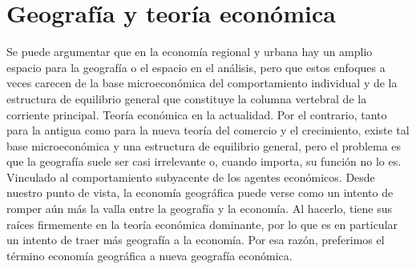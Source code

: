 \section{Geografía y teoría económica}
Se puede argumentar que en la economía regional y urbana hay un amplio espacio para la geografía o el espacio en el análisis, pero que estos enfoques a veces carecen de la base microeconómica del comportamiento individual y de la estructura de equilibrio general que constituye la columna vertebral de la corriente principal. Teoría económica en la actualidad. Por el contrario, tanto para la antigua como para la nueva teoría del comercio y el crecimiento, existe tal base microeconómica y una estructura de equilibrio general, pero el problema es que la geografía suele ser casi irrelevante o, cuando importa, su función no lo es. Vinculado al comportamiento subyacente de los agentes económicos. Desde nuestro punto de vista, la economía geográfica puede verse como un intento de romper aún más la valla entre la geografía y la economía. Al hacerlo, tiene sus raíces firmemente en la teoría económica dominante, por lo que es en particular un intento de traer más geografía a la economía. Por esa razón, preferimos el término economía geográfica a nueva geografía económica.

